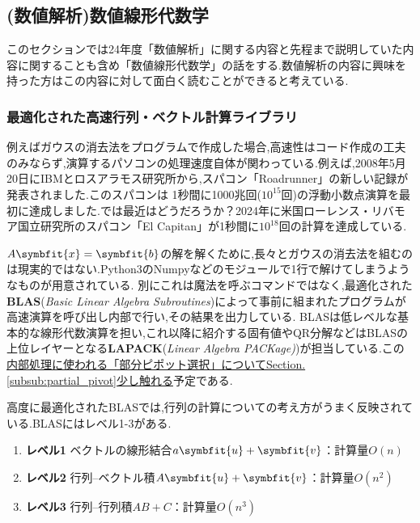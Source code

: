 \subsection[\texorpdfstring{\textcolor{blue}{(数値解析)数値線形代数学}}{(数値解析)数値線形代数学}]{(数値解析)数値線形代数学}
このセクションでは24年度「数値解析」に関する内容と先程まで説明していた内容に関することも含め「数値線形代数学」の話をする.数値解析の内容に興味を持った方はこの内容に対して面白く読むことができると考えている.
\subsubsection[\texorpdfstring{\textcolor{blue}{最適化された高速行列・ベクトル計算ライブラリ}}{最適化された高速行列・ベクトル計算ライブラリ}]{最適化された高速行列・ベクトル計算ライブラリ}
例えばガウスの消去法をプログラムで作成した場合,高速性はコード作成の工夫のみならず,演算するパソコンの処理速度自体が関わっている.例えば,2008年5月20日にIBMとロスアラモス研究所から,スパコン「Roadrunner」の新しい記録が発表されました.このスパコンは
1秒間に1000兆回($10^{15}$回)の浮動小数点演算を最初に達成しました.では最近はどうだろうか？2024年に米国ローレンス・リバモア国立研究所のスパコン「El Capitan」が1秒間に$10^{18}$回の計算を達成している.

$A\symbfit{x}=\symbfit{b}$の解を解くために,長々とガウスの消去法を組むのは現実的ではない.Python3のNumpyなどのモジュールで1行で解けてしまうようなものが用意されている.
別にこれは魔法を呼ぶコマンドではなく,最適化された\textbf{BLAS}(\textit{Basic Linear Algebra Subroutines})によって事前に組まれたプログラムが高速演算を呼び出し内部で行い,その結果を出力している.
BLASは低レベルな基本的な線形代数演算を担い,これ以降に紹介する固有値やQR分解などはBLASの上位レイヤーとなる\textbf{LAPACK}(\textit{Linear Algebra PACKage)})が担当している.この\underline{内部処理に使われる「部分ピポット選択」についてSection.\ref{subsub:partial_pivot}少し触れる}予定である.

高度に最適化されたBLASでは,行列の計算についての考え方がうまく反映されている.BLASにはレベル1-3がある.
\begin{enumerate}[label=]
    \item \textbf{レベル1} ベクトルの線形結合$a\symbfit{u}+\symbfit{v}$：計算量$O(n)$
    \item \textbf{レベル2} 行列--ベクトル積$A\symbfit{u}+\symbfit{v}$：計算量$O(n^2)$
    \item \textbf{レベル3} 行列--行列積$AB+C$：計算量$O(n^3)$
\end{enumerate}
